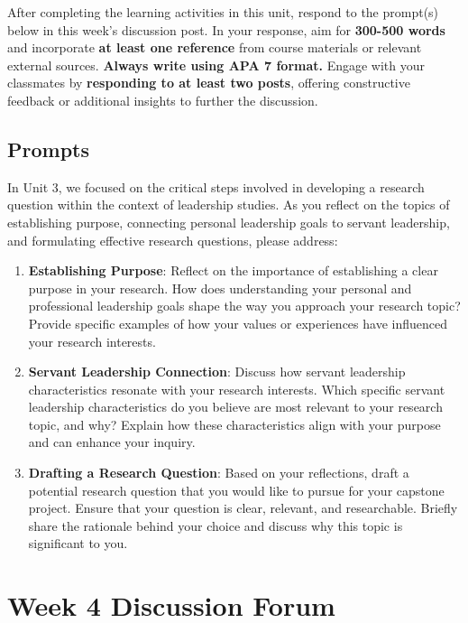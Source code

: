 \documentclass[
  letterpaper,
  DIV=11,
  numbers=noendperiod]{scrreprt}
\providecommand{\tightlist}{%
  \setlength{\itemsep}{0pt}\setlength{\parskip}{0pt}}\usepackage{longtable,booktabs,array}
\begin{document}
After completing the learning activities in this unit, respond to the
prompt(s) below in this week's discussion post. In your response, aim
for \textbf{300-500 words} and incorporate \textbf{at least one
reference} from course materials or relevant external sources.
\textbf{Always write using APA 7 format.} Engage with your classmates by
\textbf{responding to at least two posts}, offering constructive
feedback or additional insights to further the discussion.

\section{Prompts}\label{prompts-2}

In Unit 3, we focused on the critical steps involved in developing a
research question within the context of leadership studies. As you
reflect on the topics of establishing purpose, connecting personal
leadership goals to servant leadership, and formulating effective
research questions, please address:

\begin{enumerate}
\def\labelenumi{\arabic{enumi}.}
\tightlist
\item
  \textbf{Establishing Purpose}: Reflect on the importance of
  establishing a clear purpose in your research. How does understanding
  your personal and professional leadership goals shape the way you
  approach your research topic? Provide specific examples of how your
  values or experiences have influenced your research interests.
\item
  \textbf{Servant Leadership Connection}: Discuss how servant leadership
  characteristics resonate with your research interests. Which specific
  servant leadership characteristics do you believe are most relevant to
  your research topic, and why? Explain how these characteristics align
  with your purpose and can enhance your inquiry.
\item
  \textbf{Drafting a Research Question}: Based on your reflections,
  draft a potential research question that you would like to pursue for
  your capstone project. Ensure that your question is clear, relevant,
  and researchable. Briefly share the rationale behind your choice and
  discuss why this topic is significant to you.
\end{enumerate}


\chapter{Week 4 Discussion Forum}\label{week-4-discussion-forum}
\end{document}

